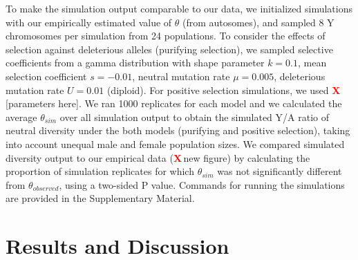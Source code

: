 \documentclass[9pt,twocolumn,twoside]{gsajnl}
\newcommand{\X}{\textcolor{red}{\bf X\,}}
\begin{document}

To make the simulation output comparable to our data, we initialized simulations with our empirically estimated value of $\theta$ (from autosomes), and sampled 8 Y chromosomes per simulation from 24 populations. To consider the effects of selection against deleterious alleles (purifying selection), we sampled selective coefficients from a gamma distribution with shape parameter $k=0.1$, mean selection coefficient $s=-0.01$, neutral mutation rate $\mu = 0.005$, deleterious mutation rate $U=0.01$ (diploid). For positive selection simulations, we used \X [parameters here]. We ran 1000 replicates for each model and we calculated the average $\theta_{sim}$ over all simulation output to obtain the simulated Y/A ratio of neutral diversity under the both models (purifying and positive selection), taking into account unequal male and female population sizes. We compared simulated diversity output to our empirical data (\X new figure) by calculating the proportion of simulation replicates for which $\theta_{sim}$ was not significantly different from $\theta_{observed}$, using a two-sided P value. Commands for running the simulations are provided in the Supplementary Material. 

\section*{Results and Discussion}
\end{document}
